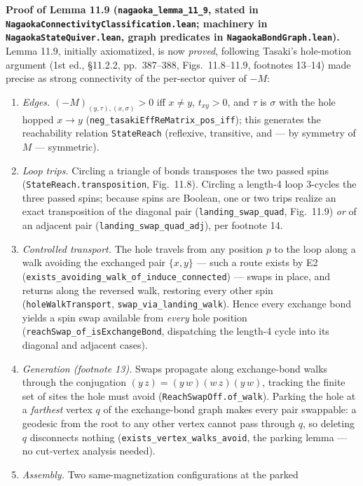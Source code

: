 \documentclass[a4paper,11pt]{article}
\begin{document}
\medskip
\noindent\textbf{Proof of Lemma 11.9 (\texttt{nagaoka\_lemma\_11\_9}, stated in
\texttt{NagaokaConnectivityClassification.lean}; machinery in
\texttt{NagaokaStateQuiver.lean}, graph predicates in
\texttt{NagaokaBondGraph.lean}).}
Lemma 11.9, initially axiomatized, is now \emph{proved}, following Tasaki's
hole-motion argument (1st ed., §11.2.2, pp.~387--388, Figs.~11.8--11.9,
footnotes 13--14) made precise as strong connectivity of the per-sector quiver
of \(-M\):
\begin{enumerate}
\item \emph{Edges.} \((-M)_{(y,\tau),(x,\sigma)} > 0\) iff \(x \ne y\),
  \(t_{xy} > 0\), and \(\tau\) is \(\sigma\) with the hole hopped \(x \to y\)
  (\texttt{neg\_tasakiEffReMatrix\_pos\_iff}); this generates the reachability
  relation \texttt{StateReach} (reflexive, transitive, and — by symmetry of
  \(M\) — symmetric).
\item \emph{Loop trips.} Circling a triangle of bonds transposes the two
  passed spins (\texttt{StateReach.transposition}, Fig.~11.8). Circling a
  length-4 loop 3-cycles the three passed spins; because spins are Boolean,
  one or two trips realize an exact transposition of the diagonal pair
  (\texttt{landing\_swap\_quad}, Fig.~11.9) \emph{or} of an adjacent pair
  (\texttt{landing\_swap\_quad\_adj}), per footnote 14.
\item \emph{Controlled transport.} The hole travels from any position \(p\) to
  the loop along a walk avoiding the exchanged pair \(\{x,y\}\) — such a route
  exists by E2 (\texttt{exists\_avoiding\_walk\_of\_induce\_connected}) — swaps
  in place, and returns along the reversed walk, restoring every other spin
  (\texttt{holeWalkTransport}, \texttt{swap\_via\_landing\_walk}). Hence every
  exchange bond yields a spin swap available from \emph{every} hole position
  (\texttt{reachSwap\_of\_isExchangeBond}, dispatching the length-4 cycle into
  its diagonal and adjacent cases).
\item \emph{Generation (footnote 13).} Swaps propagate along exchange-bond
  walks through the conjugation \((y\,z) = (y\,w)(w\,z)(y\,w)\), tracking the
  finite set of sites the hole must avoid (\texttt{ReachSwapOff.of\_walk}).
  Parking the hole at a \emph{farthest} vertex \(q\) of the exchange-bond graph
  makes every pair swappable: a geodesic from the root to any other vertex
  cannot pass through \(q\), so deleting \(q\) disconnects nothing
  (\texttt{exists\_vertex\_walks\_avoid}, the parking lemma — no cut-vertex
  analysis needed).
\item \emph{Assembly.} Two same-magnetization configurations at the parked

\end{enumerate}
\end{document}
